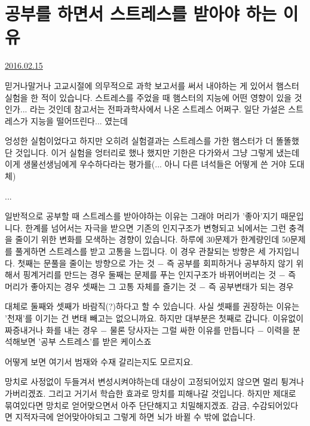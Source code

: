\section{공부를 하면서 스트레스를 받아야 하는 이유}
\href{https://www.kockoc.com/Apoc/636254}{2016.02.15}

\vspace{5mm}

믿거나말거나
고교시절에 의무적으로 과학 보고서를 써서 내야하는 게 있어서 햄스터 실험을 한 적이 있습니다.
스트레스를 주었을 때 햄스터의 지능에 어떤 영향이 있을 것인가... 라는 것인데 참고서는 전파과학사에서 나온 스트레스 어쩌구.
일단 가설은 스트레스가 지능을 떨어뜨린다... 였는데
\vspace{5mm}

엉성한 실험이었다고 하지만 오히려 실험결과는 스트레스를 가한 햄스터가 더 똘똘했단 것입니다.
이거 실험을 엉터리로 했나 했지만 기한은 다가와서 그냥 그렇게 냈는데
이게 생물선생님에게 우수하다라는 평가를(... 아니 다른 녀석들은 어떻게 쓴 거야 도대체)
\vspace{5mm}

...
\vspace{5mm}

일반적으로 공부할 때 스트레스를 받아야하는 이유는 그래야 머리가 '좋아'지기 때문입니다.
한계를 넘어서는 자극을 받으면 기존의 인지구조가 변형되고 뇌에서는 그런 충격을 줄이기 위한 변화를 모색하는 경향이 있습니다.
하루에 30문제가 한계량인데 50문제를 풀게하면 스트레스를 받고 고통을 느낍니다.
이 경우 관찰되는 방향은 세 가지입니다.
첫째는 문풀을 줄이는 방향으로 가는 것 $-$ 즉 공부를 회피하거나 공부하지 않기 위해서 핑계거리를 만드는 경우
둘째는 문제를 푸는 인지구조가 바뀌어버리는 것 $-$ 즉 머리가 좋아지는 경우
셋째는 그 고통 자체를 즐기는 것 $-$ 즉 공부변태가 되는 경우
\vspace{5mm}

대체로 둘째와 셋째가 바람직(?)하다고 할 수 있습니다. 사실 셋째를 권장하는 이유는 '천재'를 이기는 건 변태 빼고는 없으니까요.
하지만 대부분은 첫째로 갑니다.
이유없이 짜증내거나 화를 내는 경우 $-$ 물론 당사자는 그럴 싸한 이유를 만듭니다 $-$ 이력을 분석해보면 '공부 스트레스'를 받은 케이스죠
\vspace{5mm}

어떻게 보면 여기서 범재와 수재 갈리는지도 모르지요.
\vspace{5mm}

망치로 사정없이 두들겨서 변성시켜야하는데 대상이 고정되어있지 않으면 멀리 튕겨나가버리겠죠.
그리고 거기서 학습한 효과로 망치를 피해나갈 것입니다.
하지만 제대로 묶여있다면 망치로 얻어맞으면서 아주 단단해지고 치밀해지겠죠.
감금, 수감되어있다면 지적자극에 얻어맞아야되고 그렇게 하면 뇌가 바뀔 수 밖에 없습니다.
\vspace{5mm}

